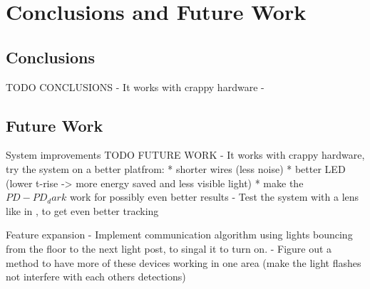 \chapter{Conclusions and Future Work}
\label{chp:conclusionsandfuturework}

\section{Conclusions}
TODO CONCLUSIONS
 - It works with crappy hardware
 - 

	

\section{Future Work}
System improvements
TODO FUTURE WORK
- It works with crappy hardware, try the system on a better platfrom:
	* shorter wires (less noise)
	* better LED (lower t-rise -> more energy saved and less visible light)
	* make the $PD - PD_dark$ work for possibly even better results
- Test the system with a lens like in \cite{PIR_Tracking}, to get even better tracking

Feature expansion
- Implement communication algorithm using lights bouncing from the floor to the next light post, to singal it to turn on.
- Figure out a method to have more of these devices working in one area (make the light flashes not interfere with each others detections)
